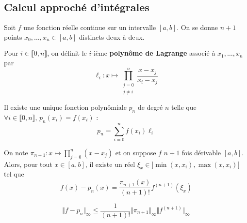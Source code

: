   \subsection{Calcul approché d'intégrales}


  Soit $f$ une fonction réelle continue sur un intervalle $[a,b]$. On se donne $n+1$ points $x_0, \dots, x_n \in [a,b]$ distincts deux-à-deux.

  \begin{definition}
    Pour $i \in \llbracket 0, n \rrbracket$, on définit le $i$-ième \textbf{polynôme de Lagrange} associé à $x_1, \dots, x_n$ par
    \[ \ell_i : x \mapsto \prod_{\substack{j=0\\j \neq i}}^n \frac{x-x_j}{x_i-x_j} \]
  \end{definition}

  \begin{theorem}
    Il existe une unique fonction polynômiale $p_n$ de degré $n$ telle que $\forall i \in \llbracket 0, n \rrbracket, \, p_n(x_i) = f(x_i)$ :
    \[ p_n = \sum_{i=0}^n f(x_i) \ell_i \]
  \end{theorem}

  \begin{theorem}
    On note $\pi_{n+1} : x \mapsto \prod_{j=0}^{n} (x-x_j)$ et on suppose $f$ $n+1$ fois dérivable $[a,b]$. Alors, pour tout $x \in [a,b]$, il existe un réel $\xi_x \in ]\min(x,x_i),\max(x,x_i)[$ tel que
    \[ f(x)-p_n(x) = \frac{\pi_{n+1}(x)}{(n+1)!} f^{(n+1)}(\xi_x) \]
  \end{theorem}

  \begin{corollary}
    \[ \Vert f - p_n \Vert_\infty \leq \frac{1}{(n+1)!} \Vert \pi_{n+1} \Vert_\infty \Vert f^{(n+1)} \Vert_\infty \]
  \end{corollary}


